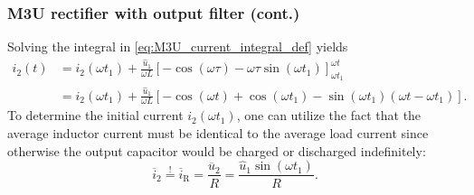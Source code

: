 \begin{frame}
	\frametitle{M3U rectifier with output filter (cont.)}
	Solving the integral in \eqref{eq:M3U_current_integral_def} yields
	\begin{equation}
		\begin{split}
			i_2(t) & = i_2(\omega t_1) + \frac{\hat{u}_1}{\omega L} \left[-\cos(\omega \tau) -\omega\tau\sin(\omega t_1) \right]_{\omega t_1}^{\omega t} \\ &= i_2(\omega t_1) + \frac{\hat{u}_1}{\omega L} \left[-\cos(\omega t) + \cos(\omega t_1) -\sin(\omega t_1)\left(\omega t - \omega t_1\right)\right].
		\end{split}
		\label{eq:M3U_current_integral}
	\end{equation}
	\pause
	To determine the initial current $i_2(\omega t_1)$, one can utilize the fact that the average inductor current must be identical to the average load current since otherwise the output capacitor would be charged or discharged indefinitely:
	\begin{equation}
		\overline{i}_2 \stackrel{!}{=} \overline{i}_\mathrm{R} = \frac{\overline{u}_2}{R} = \frac{\hat{u}_1\sin(\omega t_1)}{R}.
		\label{eq:M3U_current_average}
	\end{equation}
\end{frame}

